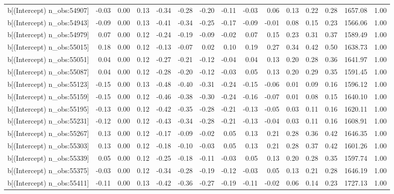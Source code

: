 \begin{table}[ht]
\begin{tabular}{rrrrrrrrrrrrrrr}
  b[(Intercept) n\_obs:54907] & -0.03 & 0.00 & 0.13 & -0.34 & -0.28 & -0.20 & -0.11 & -0.03 & 0.06 & 0.13 & 0.22 & 0.28 & 1657.08 & 1.00 \\ 
  b[(Intercept) n\_obs:54943] & -0.09 & 0.00 & 0.13 & -0.41 & -0.34 & -0.25 & -0.17 & -0.09 & -0.01 & 0.08 & 0.15 & 0.23 & 1566.06 & 1.00 \\ 
  b[(Intercept) n\_obs:54979] & 0.07 & 0.00 & 0.12 & -0.24 & -0.19 & -0.09 & -0.02 & 0.07 & 0.15 & 0.23 & 0.31 & 0.37 & 1589.49 & 1.00 \\ 
  b[(Intercept) n\_obs:55015] & 0.18 & 0.00 & 0.12 & -0.13 & -0.07 & 0.02 & 0.10 & 0.19 & 0.27 & 0.34 & 0.42 & 0.50 & 1638.73 & 1.00 \\ 
  b[(Intercept) n\_obs:55051] & 0.04 & 0.00 & 0.12 & -0.27 & -0.21 & -0.12 & -0.04 & 0.04 & 0.13 & 0.20 & 0.28 & 0.36 & 1641.97 & 1.00 \\ 
  b[(Intercept) n\_obs:55087] & 0.04 & 0.00 & 0.12 & -0.28 & -0.20 & -0.12 & -0.03 & 0.05 & 0.13 & 0.20 & 0.29 & 0.35 & 1591.45 & 1.00 \\ 
  b[(Intercept) n\_obs:55123] & -0.15 & 0.00 & 0.13 & -0.48 & -0.40 & -0.31 & -0.24 & -0.15 & -0.06 & 0.01 & 0.09 & 0.16 & 1596.12 & 1.00 \\ 
  b[(Intercept) n\_obs:55159] & -0.15 & 0.00 & 0.12 & -0.46 & -0.38 & -0.30 & -0.24 & -0.16 & -0.07 & 0.01 & 0.08 & 0.15 & 1640.10 & 1.00 \\ 
  b[(Intercept) n\_obs:55195] & -0.13 & 0.00 & 0.12 & -0.42 & -0.35 & -0.28 & -0.21 & -0.13 & -0.05 & 0.03 & 0.11 & 0.16 & 1620.11 & 1.00 \\ 
  b[(Intercept) n\_obs:55231] & -0.12 & 0.00 & 0.12 & -0.43 & -0.34 & -0.28 & -0.21 & -0.13 & -0.04 & 0.03 & 0.11 & 0.16 & 1608.91 & 1.00 \\ 
  b[(Intercept) n\_obs:55267] & 0.13 & 0.00 & 0.12 & -0.17 & -0.09 & -0.02 & 0.05 & 0.13 & 0.21 & 0.28 & 0.36 & 0.42 & 1646.35 & 1.00 \\ 
  b[(Intercept) n\_obs:55303] & 0.13 & 0.00 & 0.12 & -0.18 & -0.10 & -0.03 & 0.05 & 0.13 & 0.21 & 0.28 & 0.37 & 0.42 & 1601.26 & 1.00 \\ 
  b[(Intercept) n\_obs:55339] & 0.05 & 0.00 & 0.12 & -0.25 & -0.18 & -0.11 & -0.03 & 0.05 & 0.13 & 0.20 & 0.28 & 0.35 & 1597.74 & 1.00 \\ 
  b[(Intercept) n\_obs:55375] & -0.03 & 0.00 & 0.12 & -0.34 & -0.28 & -0.19 & -0.12 & -0.03 & 0.05 & 0.13 & 0.21 & 0.28 & 1646.19 & 1.00 \\ 
  b[(Intercept) n\_obs:55411] & -0.11 & 0.00 & 0.13 & -0.42 & -0.36 & -0.27 & -0.19 & -0.11 & -0.02 & 0.06 & 0.14 & 0.23 & 1727.13 & 1.00 \\ 

\end{tabular}
\end{table}
